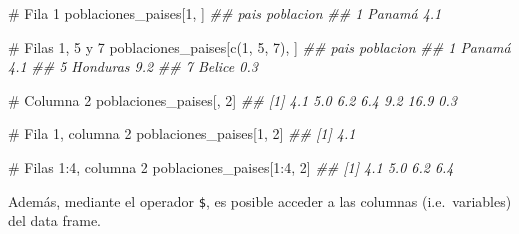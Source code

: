 \documentclass[
  letterpaper,
  DIV=11,
  numbers=noendperiod]{scrreprt}
\newenvironment{Shaded}{\begin{snugshade}}{\end{snugshade}}
\newcommand{\CommentTok}[1]{\textcolor[rgb]{0.37,0.37,0.37}{#1}}
\newcommand{\DecValTok}[1]{\textcolor[rgb]{0.68,0.00,0.00}{#1}}
\newcommand{\DocumentationTok}[1]{\textcolor[rgb]{0.37,0.37,0.37}{\textit{#1}}}
\newcommand{\FunctionTok}[1]{\textcolor[rgb]{0.28,0.35,0.67}{#1}}
\newcommand{\NormalTok}[1]{\textcolor[rgb]{0.00,0.23,0.31}{#1}}
\newcommand{\OtherTok}[1]{\textcolor[rgb]{0.00,0.23,0.31}{#1}}
\newcommand{\SpecialCharTok}[1]{\textcolor[rgb]{0.37,0.37,0.37}{#1}}
\begin{document}
\begin{Shaded}
\begin{Highlighting}[]
\CommentTok{\# Fila 1}
\NormalTok{poblaciones\_paises[}\DecValTok{1}\NormalTok{, ]}
\DocumentationTok{\#\#     pais poblacion}
\DocumentationTok{\#\# 1 Panamá       4.1}

\CommentTok{\# Filas 1, 5 y 7}
\NormalTok{poblaciones\_paises[}\FunctionTok{c}\NormalTok{(}\DecValTok{1}\NormalTok{, }\DecValTok{5}\NormalTok{, }\DecValTok{7}\NormalTok{), ]}
\DocumentationTok{\#\#       pais poblacion}
\DocumentationTok{\#\# 1   Panamá       4.1}
\DocumentationTok{\#\# 5 Honduras       9.2}
\DocumentationTok{\#\# 7   Belice       0.3}

\CommentTok{\# Columna 2}
\NormalTok{poblaciones\_paises[, }\DecValTok{2}\NormalTok{]}
\DocumentationTok{\#\# [1]  4.1  5.0  6.2  6.4  9.2 16.9  0.3}

\CommentTok{\# Fila 1, columna 2}
\NormalTok{poblaciones\_paises[}\DecValTok{1}\NormalTok{, }\DecValTok{2}\NormalTok{]}
\DocumentationTok{\#\# [1] 4.1}

\CommentTok{\# Filas 1:4, columna 2}
\NormalTok{poblaciones\_paises[}\DecValTok{1}\SpecialCharTok{:}\DecValTok{4}\NormalTok{, }\DecValTok{2}\NormalTok{]}
\DocumentationTok{\#\# [1] 4.1 5.0 6.2 6.4}
\end{Highlighting}
\end{Shaded}

Además, mediante el operador \texttt{\$}, es posible acceder a las
columnas (i.e.~variables) del data frame.

\begin{Shaded}
\end{Shaded}
\end{document}
